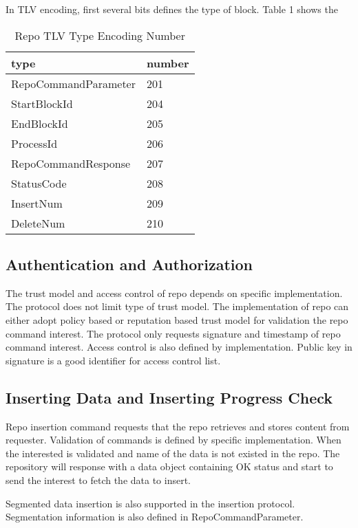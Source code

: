 \documentclass{acm_proc_article-sp}
\begin{document}
In TLV encoding, first several bits defines the type of block. Table 1 shows the 

\begin{table}[!hbp]
\centering

\begin{tabular}{l l}

\hline
type & number \\
\hline
RepoCommandParameter & 201 \\
StartBlockId & 204 \\
EndBlockId & 205 \\
ProcessId & 206 \\
RepoCommandResponse & 207\\
StatusCode & 208 \\
InsertNum & 209 \\
DeleteNum & 210 \\
\hline

\end{tabular}
\caption{Repo TLV Type Encoding Number}
\end{table}



\subsection{Authentication and Authorization}
The trust model and access control of repo depends on specific implementation. The protocol does not limit type of trust model. The implementation of repo can either adopt policy based or reputation based trust model for validation the repo command interest. The protocol only requests signature and timestamp of repo command interest. Access control is also defined by implementation. Public key in signature is a good identifier for access control list.

\subsection{Inserting Data and Inserting Progress Check}

Repo insertion command requests that the repo retrieves and stores content from requester. Validation of commands is defined by specific implementation. When the interested is validated and name of the data is not existed in the repo. The repository will response with a data object containing OK status and start to send the interest to fetch the data to insert.

Segmented data insertion is also supported in the insertion protocol. Segmentation information is also defined in RepoCommandParameter.
\end{document}
